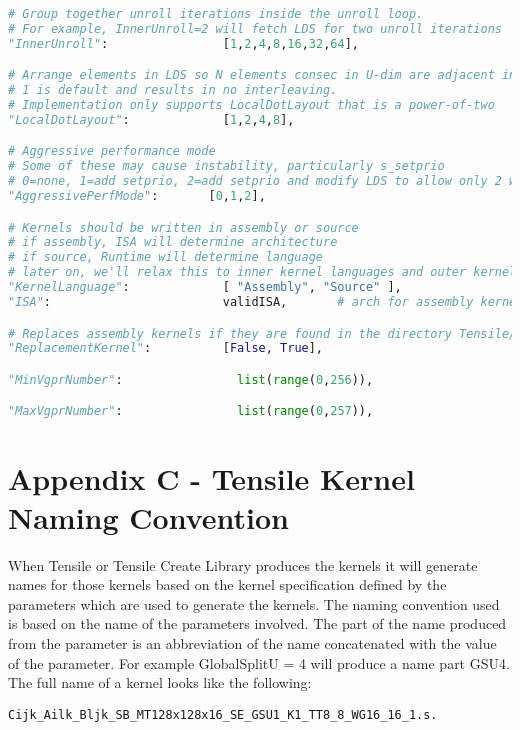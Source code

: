 \documentclass[]{article}
\begin{document}
\begin{lstlisting}[language=python,breaklines=true]
# Group together unroll iterations inside the unroll loop.
# For example, InnerUnroll=2 will fetch LDS for two unroll iterations
"InnerUnroll":                [1,2,4,8,16,32,64],

# Arrange elements in LDS so N elements consec in U-dim are adjacent in LDS
# 1 is default and results in no interleaving.
# Implementation only supports LocalDotLayout that is a power-of-two
"LocalDotLayout":             [1,2,4,8],

# Aggressive performance mode
# Some of these may cause instability, particularly s_setprio
# 0=none, 1=add setprio, 2=add setprio and modify LDS to allow only 2 waves/simd
"AggressivePerfMode":       [0,1,2],

# Kernels should be written in assembly or source
# if assembly, ISA will determine architecture
# if source, Runtime will determine language
# later on, we'll relax this to inner kernel languages and outer kernel languages, such as inline asm embedded in ocl or in llvm
"KernelLanguage":             [ "Assembly", "Source" ],
"ISA":                        validISA,       # arch for assembly kernels

# Replaces assembly kernels if they are found in the directory Tensile/Tensile/ReplacementKernels
"ReplacementKernel":          [False, True],

"MinVgprNumber":                list(range(0,256)),

"MaxVgprNumber":                list(range(0,257)),
\end{lstlisting}

\section{Appendix C - Tensile Kernel Naming Convention}
\label{sec:appendixC}

When Tensile or Tensile Create Library produces the kernels it will generate names for those kernels based on the kernel specification defined by the parameters which are used to generate the kernels. The naming convention used is based on the name of the parameters involved. The part of the name produced from the parameter is an abbreviation of the name concatenated with the value of the parameter. For example GlobalSplitU = 4 will produce a name part GSU4. The full name of a kernel looks like the following:

\begin{verbatim}
Cijk_Ailk_Bljk_SB_MT128x128x16_SE_GSU1_K1_TT8_8_WG16_16_1.s.
\end{verbatim}
\end{document}
